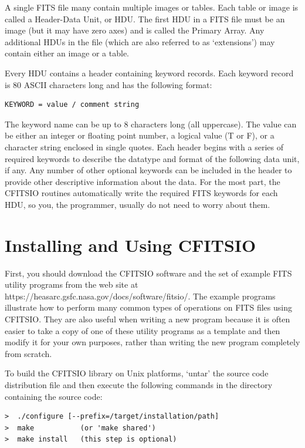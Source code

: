 \documentclass[11pt]{article}
\begin{document}
A single FITS file many contain multiple images or tables.  Each table
or image is called a Header-Data Unit, or HDU.  The first HDU in a FITS
file must be an image (but it may have zero axes) and is called the
Primary Array.  Any additional HDUs in the file (which are also
referred to as `extensions') may contain either an image or a table.

Every HDU contains a header containing keyword records.  Each keyword
record is 80 ASCII characters long and has the following format:

\begin{verbatim}
KEYWORD = value / comment string
\end{verbatim}

The keyword name can be up to 8 characters long (all uppercase).  The
value can be either an integer or floating point number, a logical
value (T or F), or a character string enclosed in single quotes.  Each
header begins with a series of required keywords to describe the
datatype and format of the following data unit, if any.  Any number of
other optional keywords can be included in  the header to provide other
descriptive information about the data.  For the most part, the CFITSIO
routines automatically write the required FITS keywords for each HDU,
so you, the programmer, usually do not need to worry about them.

\section{Installing and Using CFITSIO}

First, you should download the CFITSIO software and the set of example
FITS utility programs from the web site at
https://heasarc.gsfc.nasa.gov/docs/software/fitsio/.  The example programs illustrate
how to perform many common types of operations on FITS files using
CFITSIO.  They are also useful when writing a new program because it is
often easier to take a copy of one of these utility programs as a
template and then modify it for your own purposes, rather than writing
the new program completely from scratch.

To build the CFITSIO library on Unix platforms, `untar' the source code
distribution file and then execute the following commands in the
directory containing the source code:

\begin{verbatim}
>  ./configure [--prefix=/target/installation/path]
>  make           (or 'make shared')
>  make install   (this step is optional)
\end{verbatim}
\end{document}
